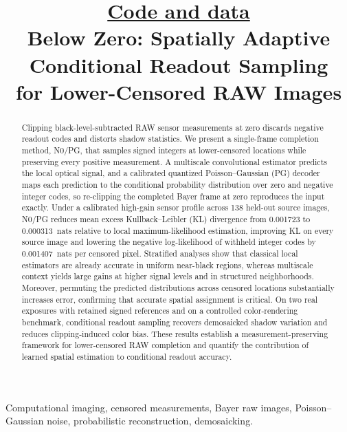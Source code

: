 \documentclass[10pt,twocolumn,journal]{IEEEtran}
\begin{document}
\title{{\normalsize \href{https://github.com/y-g-jiang/Video-RAW-Black-Level-Correction-Net/tree/main/below_zero}{Code and data}}\\[6pt]Below Zero: Spatially Adaptive\\Conditional Readout Sampling\\for Lower-Censored RAW Images}
\author{\BZAuthorBlockEN}
\maketitle
\thispagestyle{fancy}

\begin{abstract}
Clipping black-level-subtracted RAW sensor measurements at zero discards negative readout codes and distorts shadow statistics. We present a single-frame completion method, N0/PG, that samples signed integers at lower-censored locations while preserving every positive measurement. A multiscale convolutional estimator predicts the local optical signal, and a calibrated quantized Poisson--Gaussian (PG) decoder maps each prediction to the conditional probability distribution over zero and negative integer codes, so re-clipping the completed Bayer frame at zero reproduces the input exactly. Under a calibrated high-gain sensor profile across 138 held-out source images, N0/PG reduces mean excess Kullback--Leibler (KL) divergence from 0.001723 to 0.000313~nats relative to local maximum-likelihood estimation, improving KL on every source image and lowering the negative log-likelihood of withheld integer codes by 0.001407~nats per censored pixel. Stratified analyses show that classical local estimators are already accurate in uniform near-black regions, whereas multiscale context yields large gains at higher signal levels and in structured neighborhoods. Moreover, permuting the predicted distributions across censored locations substantially increases error, confirming that accurate spatial assignment is critical. On two real exposures with retained signed references and on a controlled color-rendering benchmark, conditional readout sampling recovers demosaicked shadow variation and reduces clipping-induced color bias. These results establish a measurement-preserving framework for lower-censored RAW completion and quantify the contribution of learned spatial estimation to conditional readout accuracy.
\end{abstract}

\begin{IEEEkeywords}
Computational imaging, censored measurements, Bayer raw images, Poisson--Gaussian noise, probabilistic reconstruction, demosaicking.
\end{IEEEkeywords}
\end{document}
